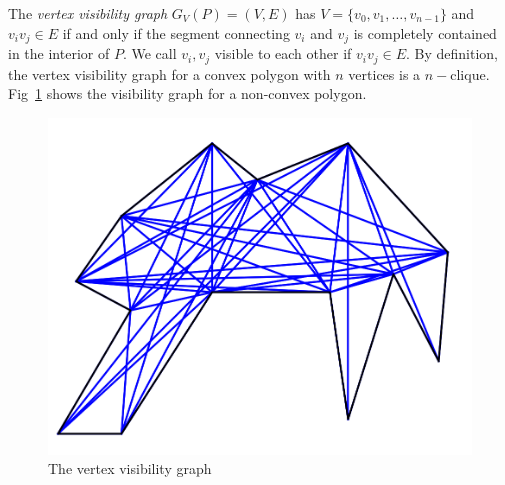 \documentclass[letterpaper, 10 pt, conference]{ieeeconf}  %
\begin{document}
The \textit{vertex visibility graph} $G_V(P) = (V, E)$ has $V = \{v_0, v_1, \ldots, v_{n-1}\}$ and $v_iv_j\in E$ if and only if the segment connecting $v_i$ and $v_j$ is completely contained in the interior of $P$. We call $v_i, v_j$ visible to each other if $v_iv_j\in E$. By definition, the vertex visibility graph for a convex polygon with $n$ vertices is a $n-$clique. Fig~\ref{fig:vvg} shows the visibility graph for a non-convex polygon.
\begin{figure}
    \includegraphics[width=0.8\linewidth]{images/viz_graph.png}
    \centering
    \caption{The vertex visibility graph}\label{fig:vvg}
    \centering
\end{figure}
\end{document}

